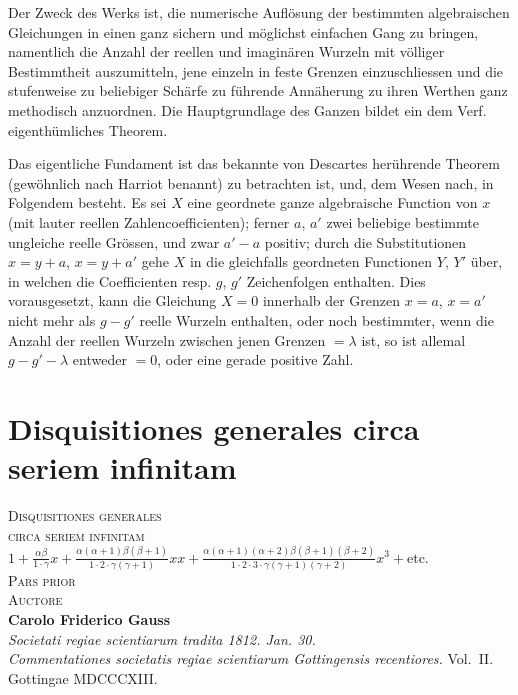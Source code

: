 \documentclass[12pt,a4paper]{article}
\newcommand{\1}{\ensuremath{\mathrlap{\,|\,}}} %
\begin{document}
Der Zweck des Werks ist, die numerische Auflösung der bestimmten algebraischen Gleichungen in einen ganz sichern und möglichst einfachen Gang zu bringen, namentlich die Anzahl der reellen und imaginären Wurzeln mit völliger Bestimmtheit auszumitteln, jene einzeln in feste Grenzen einzuschliessen und die stufenweise zu beliebiger Schärfe zu führende Annäherung zu ihren Werthen ganz methodisch anzuordnen. Die Hauptgrundlage des Ganzen bildet ein dem Verf. eigenthümliches Theorem.

Das eigentliche Fundament ist das bekannte von Descartes herührende Theorem (gewöhnlich nach Harriot benannt) zu betrachten ist, und, dem Wesen nach, in Folgendem besteht. Es sei $X$ eine geordnete ganze algebraische Function von $x$ (mit lauter reellen Zahlencoefficienten); ferner $a$, $a'$ zwei beliebige bestimmte ungleiche reelle Grössen, und zwar $a' - a$ positiv; durch die Substitutionen $x = y+a$, $x = y+a'$ gehe $X$ in die gleichfalls geordneten Functionen $Y$, $Y'$ über, in welchen die Coefficienten resp. $g$, $g'$ Zeichenfolgen enthalten. Dies vorausgesetzt, kann die Gleichung $X = 0$ innerhalb der Grenzen $x = a$, $x = a'$ nicht mehr als $g - g'$ reelle Wurzeln enthalten, oder noch bestimmter, wenn die Anzahl der reellen Wurzeln zwischen jenen Grenzen $= \lambda$ ist, so ist allemal $g - g' - \lambda$ entweder $= 0$, oder eine gerade positive Zahl.

\newpage
\section*{Disquisitiones generales circa seriem infinitam}

\begin{center}
\Large\textsc{Disquisitiones generales}\\[4pt]
\Large\textsc{circa seriem infinitam}\\[8pt]
\normalsize
$1 + \frac{\alpha\beta}{1\cdot\gamma}x + \frac{\alpha(\alpha+1)\beta(\beta+1)}{1\cdot 2\cdot\gamma(\gamma+1)}xx + \frac{\alpha(\alpha+1)(\alpha+2)\beta(\beta+1)(\beta+2)}{1\cdot 2\cdot 3\cdot\gamma(\gamma+1)(\gamma+2)}x^3 + \text{etc.}$\\[8pt]
\textsc{Pars prior}\\[6pt]
\textsc{Auctore}\\[4pt]
\textbf{Carolo Friderico Gauss}\\[6pt]
\textit{Societati regiae scientiarum tradita 1812. Jan. 30.}\\[6pt]
\textit{Commentationes societatis regiae scientiarum Gottingensis recentiores.} Vol.~II.\\
Gottingae MDCCCXIII.
\end{center}
\end{document}
